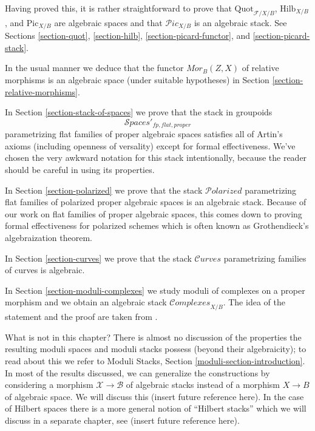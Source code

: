 \documentclass{stacks-project}
\theoremstyle{plain}
\theoremstyle{definition}
\theoremstyle{remark}
\numberwithin{equation}{subsection}
\def\Spacesstack{\mathcal{S}\!\mathit{paces}}
\def\Quotfunctor{\mathrm{Quot}}
\def\Hilbfunctor{\mathrm{Hilb}}
\def\Curvesstack{\mathcal{C}\!\mathit{urves}}
\def\Polarizedstack{\mathcal{P}\!\mathit{olarized}}
\def\Complexesstack{\mathcal{C}\!\mathit{omplexes}}
\def\Picardstack{\mathcal{P}\!\mathit{ic}}
\def\Picardfunctor{\mathrm{Pic}}
\begin{document}
\medskip\noindent
Having proved this, it is rather straightforward to prove that
$\Quotfunctor_{\mathcal{F}/X/B}$, $\Hilbfunctor_{X/B}$, and
$\Picardfunctor_{X/B}$ are algebraic spaces and that
$\Picardstack_{X/B}$ is an algebraic stack. See
Sections \ref{section-quot}, \ref{section-hilb},
\ref{section-picard-functor}, and \ref{section-picard-stack}.

\medskip\noindent
In the usual manner we deduce that the functor $\mathit{Mor}_B(Z, X)$
of relative morphisms is an algebraic space (under suitable
hypotheses) in Section \ref{section-relative-morphisms}.

\medskip\noindent
In Section \ref{section-stack-of-spaces} we prove that the stack in
groupoids
$$
\Spacesstack'_{fp, flat, proper}
$$
parametrizing flat families of proper algebraic spaces satisfies all
of Artin's axioms (including openness of versality) except for
formal effectiveness. We've chosen the very awkward notation for
this stack intentionally, because the reader should be careful
in using its properties.

\medskip\noindent
In Section \ref{section-polarized} we prove that the stack
$\Polarizedstack$
parametrizing flat families of polarized proper algebraic spaces
is an algebraic stack. Because of our work on flat families of proper
algebraic spaces, this comes down to proving
formal effectiveness for polarized schemes which is often known
as Grothendieck's algebraization theorem.

\medskip\noindent
In Section \ref{section-curves} we prove that the stack
$\Curvesstack$ parametrizing families of curves is algebraic.

\medskip\noindent
In Section \ref{section-moduli-complexes}
we study moduli of complexes on a proper morphism
and we obtain an algebraic stack $\Complexesstack_{X/B}$.
The idea of the statement and the proof are taken from
\cite{lieblich-complexes}.

\medskip\noindent
What is not in this chapter? There is almost no discussion of
the properties the resulting moduli spaces and moduli stacks
possess (beyond their algebraicity); to read about this we
refer to Moduli Stacks, Section \ref{moduli-section-introduction}.
In most of the results discussed, we can generalize the constructions
by considering a morphism $\mathcal{X} \to \mathcal{B}$ of algebraic
stacks instead of a morphism $X \to B$ of algebraic space.
We will discuss this (insert future reference here).
In the case of Hilbert spaces there is a more general notion of
``Hilbert stacks'' which we will discuss in a separate chapter, see
(insert future reference here).
\end{document}
